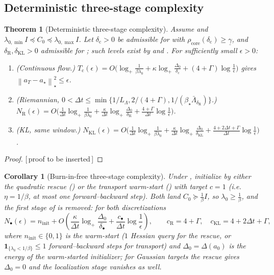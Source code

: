 \documentclass[11pt]{article}
\theoremstyle{plain}
\newtheorem{theorem}{Theorem}[section]
\newtheorem{corollary}[corollary]{Corollary}
\theoremstyle{definition}
\theoremstyle{remark}
\newcommand{\KL}{\mathrm{KL}}
\newcommand{\Id}{I}
\newcommand{\Riem}{\mathrm{R}}
\newcommand{\norm}[1]{\left\lVert #1\right\rVert}
\newcommand{\logp}{\log_+}
\newcommand{\LB}{L_\Lambda}
\newcommand{\gund}{\underline{\gamma}}
\newcommand{\PROOFHOLE}{{\color{red}\textsf{[\,proof to be inserted\,]}}}
\begin{document}
\subsection{Deterministic three-stage complexity}
\label{sec:three-stage}

\begin{theorem}[Deterministic three-stage complexity]
\label{thm:det-three-stage}
Assume  and $\lambda_{0,\min}\Id\preceq C_0\preceq\lambda_{0,\max}\Id$.
Let $\delta_{\mathrm c}>0$ be admissible for  with
$\rho_{\mathrm{core}}(\delta_{\mathrm c})\geq\gund$, and $\delta_{\Riem},\delta_{\KL}>0$ admissible for
; such levels exist by  and .
For sufficiently small $\epsilon>0$:
\begin{enumerate}
\item \textup{(Continuous flow.)}
$T_{\mathrm c}(\epsilon)=O\bigl(\logp\tfrac1{\beta\lambda_0}+\kappa\logp\tfrac{\Delta_0}{\delta_{\mathrm c}}+(4+\Gamma)\log\tfrac1\epsilon\bigr)$
gives $\norm{a_T-a_\star}_\star^2\leq\epsilon$.
\item \textup{(Riemannian, $0<\Delta t\leq\min\{1/\LB,2/(4+\Gamma),1/(\beta_\star\bar\Lambda_{\delta_{\Riem}})\}$.)}
$N_{\Riem}(\epsilon)=O\bigl(\tfrac1{\Delta t}\logp\tfrac1{\beta\lambda_0}+\tfrac\kappa{\Delta t}\logp\tfrac{\Delta_0}{\delta_{\Riem}}+\tfrac{4+\Gamma}{\Delta t}\log\tfrac1\epsilon\bigr)$.
\item \textup{(KL, same window.)}
$N_{\KL}(\epsilon)=O\bigl(\tfrac1{\Delta t}\logp\tfrac1{\beta\lambda_0}+\tfrac\kappa{\Delta t}\logp\tfrac{\Delta_0}{\delta_{\KL}}+\tfrac{4+2\Delta t+\Gamma}{\Delta t}\log\tfrac1\epsilon\bigr)$.
\end{enumerate}
\end{theorem}

\begin{proof}
\PROOFHOLE
\end{proof}

\begin{corollary}[Burn-in-free three-stage complexity]
\label{cor:burnin-free}
Under , initialize by either the quadratic rescue
() or the transport warm-start () \emph{with target
$c=1$} (i.e.\ $\eta=1/\beta$, at most one forward--backward step). Both land $C_0\succeq\tfrac1\beta\Id$,
so $\lambda_0\geq\tfrac1\beta$, and the first stage of  is removed: for both
discretizations
\[
    N_\bullet(\epsilon)=n_{\mathrm{init}}
    +O\!\left(\frac\kappa{\Delta t}\logp\frac{\Delta_0}{\delta_\bullet}
    +\frac{c_\bullet}{\Delta t}\log\frac1\epsilon\right),
    \qquad c_{\Riem}=4+\Gamma,\quad c_{\KL}=4+2\Delta t+\Gamma,
\]
where $n_{\mathrm{init}}\in\{0,1\}$ is the warm-start ($1$ Hessian query for the rescue, or
$\mathbf 1_{\{\lambda_0<1/\beta\}}\leq1$ forward--backward steps for transport) and $\Delta_0=\Delta(a_0)$
is the energy of the warm-started initializer; for Gaussian targets the rescue gives $\Delta_0=0$ and
the localization stage vanishes as well.
\end{corollary}
\end{document}
